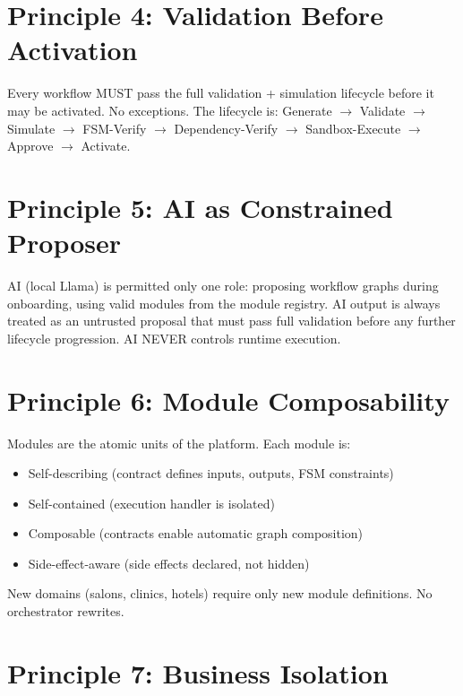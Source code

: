 \documentclass[12pt, a4paper]{report}
\newenvironment{invariantbox}[1]{%
  \begin{tcolorbox}[
    colback=red!4!white,
    colframe=warningred,
    title={\textbf{INVARIANT: #1}},
    fonttitle=\small\bfseries
  ]
}{%
  \end{tcolorbox}
}
\newenvironment{principlebox}[1]{%
  \begin{tcolorbox}[
    colback=blue!4!white,
    colframe=primaryblue,
    title={\textbf{PRINCIPLE: #1}},
    fonttitle=\small\bfseries
  ]
}{%
  \end{tcolorbox}
}
\begin{document}
\section{Principle 4: Validation Before Activation}

\begin{invariantbox}{No Unvalidated Workflow May Execute}
Every workflow MUST pass the full validation + simulation lifecycle before it may be activated. No exceptions. The lifecycle is: Generate $\to$ Validate $\to$ Simulate $\to$ FSM-Verify $\to$ Dependency-Verify $\to$ Sandbox-Execute $\to$ Approve $\to$ Activate.
\end{invariantbox}

\section{Principle 5: AI as Constrained Proposer}

\begin{principlebox}{AI Role Constraint}
AI (local Llama) is permitted only one role: proposing workflow graphs during onboarding, using valid modules from the module registry. AI output is always treated as an untrusted proposal that must pass full validation before any further lifecycle progression. AI NEVER controls runtime execution.
\end{principlebox}

\section{Principle 6: Module Composability}

Modules are the atomic units of the platform. Each module is:
\begin{itemize}
  \item Self-describing (contract defines inputs, outputs, FSM constraints)
  \item Self-contained (execution handler is isolated)
  \item Composable (contracts enable automatic graph composition)
  \item Side-effect-aware (side effects declared, not hidden)
\end{itemize}

New domains (salons, clinics, hotels) require only new module definitions. No orchestrator rewrites.

\section{Principle 7: Business Isolation}
\end{document}
